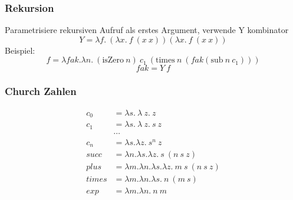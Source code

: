 \subsubsection{Rekursion}
Parametrisiere rekursiven Aufruf als erstes Argument, verwende Y kombinator\\
$$Y = \lambda f.\: (\lambda x.\: f\: (x\: x))(\lambda x. \: f \: (x \: x))$$
Beispiel:\\
$$f = \lambda fak. \lambda n. \medspace (\text{isZero}\medspace n)  \medspace c_1 \medspace (\text{times} \medspace n \medspace (fak (\text{sub}\medspace n \medspace c_1)))$$
$$fak = Y \medspace f$$

\subsubsection{Church Zahlen}
\begin{align*}
c_0 &= \lambda s.\ \lambda\ z.\ z\\
c_1 &= \lambda s.\ \lambda\ z.\ s\ z\\
& \cdots \\
c_n &= \lambda s. \lambda z.\ s^n\ z\\
succ &= \lambda n. \lambda s. \lambda z.\ s\ (n\ s\ z)\\
plus &= \lambda m. \lambda n. \lambda s. \lambda z.\ m\ s\ (n\ s\ z)\\
times &= \lambda m. \lambda n. \lambda s.\ n\ (m\ s)\\
exp &= \lambda m. \lambda n.\ n\ m\\
\end{align*}

